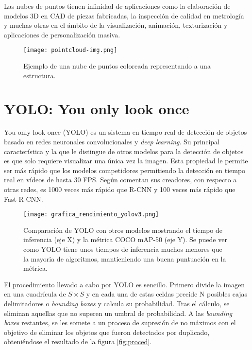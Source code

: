Las nubes de puntos tienen infinidad de aplicaciones como la elaboración de modelos 3D en CAD de piezas fabricadas, la inspección de calidad en metrología y muchas otras en el ámbito de la visualización, animación, texturización y aplicaciones de personalización masiva.\\

\begin{figure}[h]
	\begin{center} 
		\texttt{[image: pointcloud-img.png]}
	\end{center}
	\caption{Ejemplo de una nube de puntos coloreada representando a una estructura.}
	\label{fig:pc}
\end{figure}

\section{YOLO: You only look once}

You only look once (YOLO) es un sistema en tiempo real de detección de objetos basado en redes neuronales convolucionales y \textit{deep learning}. Su principal característica y la que le distingue de otros modelos para la detección de objetos es que solo requiere visualizar una única vez la imagen. Esta propiedad le permite ser más rápido que los modelos competidores permitiendo la detección en tiempo real en vídeos de hasta 30 FPS. Según comentan sus creadores, con respecto a otras redes, es 1000 veces más rápido que R-CNN y 100 veces más rápido que Fast R-CNN.  \cite{yolo} \\

\begin{figure}[H]
	\begin{center} 
		\texttt{[image: grafica\_rendimiento\_yolov3.png]}
	\end{center}
	\caption{Comparación de YOLO con otros modelos mostrando el tiempo de inferencia (eje X) y la métrica COCO mAP-50 (eje Y). Se puede ver como YOLO tiene unos tiempos de inferencia muchos menores que la mayoria de algoritmos, mantieniendo una buena puntuación en la métrica.}
	\label{fig:rend}
\end{figure}

El procedimiento llevado a cabo por YOLO es sencillo. Primero divide la imagen en una cuadrícula de $S \times S$ y en cada una de estas celdas precide N posibles cajas delimitadores o \textit{bounding boxes} y calcula su probabilidad. Tras el cálculo, se eliminan aquellas que no superen un umbral de probabilidad. A las \textit{bounding boxes} restantes, se les somete a un proceso de supresión de no máximos con el objetivo de eliminar los objetos que fueron detectados por duplicado, obteniéndose el resultado de la figura \ref{fig:proced}.\\

